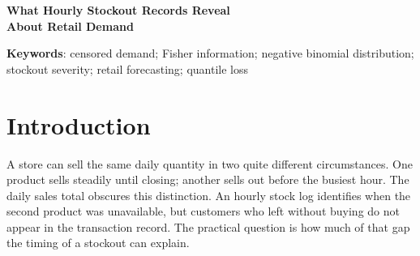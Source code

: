 \documentclass[11pt,a4paper]{article}
\begin{document}
\begin{center}{\LARGE\bfseries What Hourly Stockout Records Reveal\\About Retail Demand\par}\end{center}


\begin{abstract}\noindent

An hour without stock can remove very different amounts of demand at opening time and at peak trading time. We examine what hourly availability records can tell us about both the precision of a demand-level estimate and the value of reconstructing a sales history. We derive Fisher information for two observation mechanisms with the same expected lost share, a daily stock cap and independent thinning of purchases. Applied to 1,500 high-volume FreshRetailNet-50K store--product series, the inferred number of effective days depends on the assumed count scale and observation mechanism. We assess the empirical value of hourly records by applying historical stockout patterns to 5,711 fully stocked days with observable sales. Weighting unavailable hours by their usual share of sales reduces reconstruction error from 12.61\% to 11.16\%. On the official forecast week, volume-weighted Tobit reconstruction reduces weighted absolute percentage error from 23.42\% for raw sales to 20.46\%, with aggregate bias of \ensuremath{-}0.33\%. It also improves on raw sales in the preceding week, although interpolation is more accurate there. Hourly records help locate missing volume; the resulting gain in forecast accuracy depends on the comparison method and evaluation window.

\end{abstract}
\noindent \textbf{Keywords}: censored demand; Fisher information; negative binomial distribution; stockout severity; retail forecasting; quantile loss

\section{Introduction}

A store can sell the same daily quantity in two quite different circumstances. One product sells steadily until closing; another sells out before the busiest hour. The daily sales total obscures this distinction. An hourly stock log identifies when the second product was unavailable, but customers who left without buying do not appear in the transaction record. The practical question is how much of that gap the timing of a stockout can explain.
\end{document}
